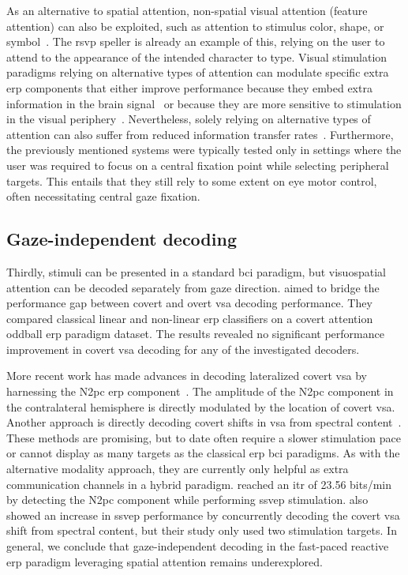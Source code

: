 As an alternative to spatial attention, non-spatial visual attention (feature attention) can also be exploited, such as
attention to stimulus color, shape, or symbol~\cite{Zhang2010,Treder2011,Hwang2015}.
The \ac{rsvp} speller is already an example of this, relying on the user to
attend to the appearance of the intended character to type.
Visual stimulation paradigms relying on alternative types of attention
can modulate specific extra \ac{erp} components that either improve performance
because they embed extra information in the brain signal~\cite{Xu2022}
or because they are more sensitive to stimulation in the visual
periphery~\cite{Schaeff2012}.
Nevertheless, solely relying on alternative types of attention can also suffer from
reduced information transfer rates~\cite{Chennu2013}.
Furthermore, the previously mentioned systems were typically tested only in
settings where the user was required to focus on a central fixation point while
selecting peripheral targets.
This entails that they still rely to some extent on
eye motor control, often necessitating central gaze fixation.

\subsection{Gaze-independent decoding}
\label{sec:gaze-independence/sota/decoding}

Thirdly, stimuli can be presented in a standard \ac{bci} paradigm, but visuospatial
attention can be decoded separately from gaze direction.
\textcite{Aloise2012} aimed to bridge the performance gap between covert and
overt \ac{vsa} decoding performance.
They compared classical linear and non-linear \ac{erp} classifiers on a covert
attention oddball \ac{erp} paradigm dataset.
The results revealed no significant performance improvement in covert \ac{vsa}
decoding for any of the investigated decoders.

More recent work has made advances in decoding lateralized covert
\ac{vsa} by harnessing the N2pc \ac{erp}
component~\cite{Thiery2016,Reichert2020b,Wang2022}.
The amplitude of the N2pc component in the contralateral hemisphere is directly modulated
by the location of covert \ac{vsa}.
Another approach is directly decoding covert shifts in \ac{vsa} from spectral
content~\cite{Tonin2013}.
These methods are promising, but to date often require a slower stimulation pace or cannot display as
many targets as the classical \ac{erp} \ac{bci} paradigms.
As with the alternative modality approach, they are currently only helpful as
extra communication channels in a hybrid paradigm.
\textcite{Xu2016} reached an \ac{itr} of 23.56 bits/min by detecting the N2pc
component while performing \ac{ssvep} stimulation.
\textcite{Egan2017} also showed an increase in \ac{ssvep} performance by
concurrently decoding the covert \ac{vsa} shift from spectral content, but
their study only used two stimulation targets.
In general, we conclude that gaze-independent decoding in the fast-paced reactive
\ac{erp} paradigm leveraging spatial attention remains underexplored.

